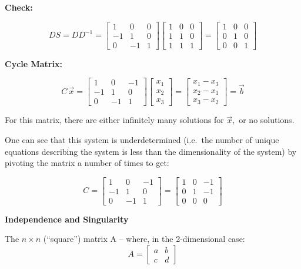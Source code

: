 \documentclass{article}
\begin{document}
\textbf{Check:}

\[DS = DD^{-1} = \begin{bmatrix}  1 & 0 & 0 \\ -1 & 1 & 0 \\ 0 & -1 & 1 \end{bmatrix} \begin{bmatrix} 1 & 0 & 0 \\ 1 & 1 & 0 \\ 1 & 1 & 1 \end{bmatrix} = \begin{bmatrix}  1 & 0 & 0 \\ 0 & 1 & 0 \\ 0 & 0 & 1 \end{bmatrix} \]

\textbf{Cycle Matrix:}

\[C \, \vec{x} = \begin{bmatrix}  1 & 0 & -1 \\ -1 & 1 & 0 \\ 0 & -1 & 1 \end{bmatrix} \begin{bmatrix}  x_1 \\ x_2 \\ x_3 \end{bmatrix} = \begin{bmatrix}  x_1 - x_3 \\ x_2 - x_1 \\ x_3 - x_2 \end{bmatrix} = \vec{b} \]

For this matrix, there are either infinitely many solutions for
\(\vec{x},\) or no solutions.

One can see that this system is underdetermined (i.e.~the number of
unique equations describing the system is less than the dimensionality
of the system) by pivoting the matrix a number of times to get:

\[C = \begin{bmatrix}  1 & 0 & -1 \\ -1 & 1 & 0 \\ 0 & -1 & 1 \end{bmatrix} = \begin{bmatrix}  1 & 0 & -1 \\ 0 & 1 & -1 \\ 0 & 0 & 0 \end{bmatrix} \]

\textbf{Independence and Singularity}

The \emph{\(n \times n\)} (``square'') matrix A -- where, in the
2-dimensional case: \[A = \begin{bmatrix} a & b \\ c & d \end{bmatrix}\]
\end{document}
